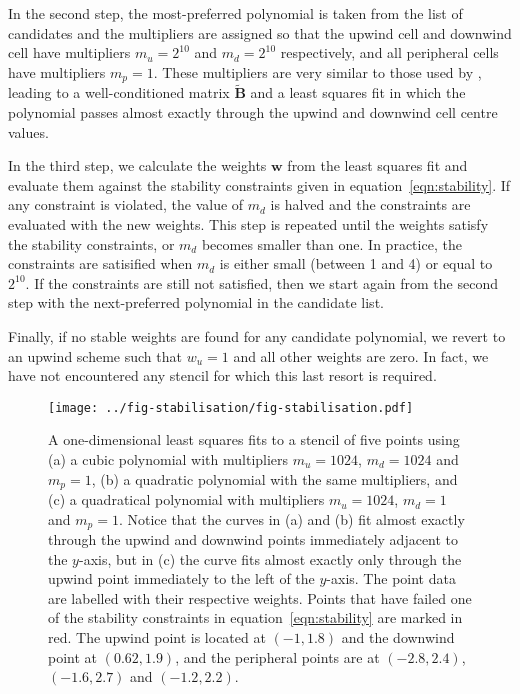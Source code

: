 In the second step, the most-preferred polynomial is taken from the list of candidates and the multipliers are assigned so that the upwind cell and downwind cell have multipliers $m_u = 2^{10}$ and $m_d = 2^{10}$ respectively, and all peripheral cells have multipliers $m_p = 1$.  These multipliers are very similar to those used by \citet{lashley2002}, leading to a well-conditioned matrix $\mathbf{\tilde{B}}$ and a least squares fit in which the polynomial passes almost exactly through the upwind and downwind cell centre values.

In the third step, we calculate the weights $\mathbf{w}$ from the least squares fit and evaluate them against the stability constraints given in equation~\eqref{eqn:stability}.  If any constraint is violated, the value of $m_d$ is halved and the constraints are evaluated with the new weights.  This step is repeated until the weights satisfy the stability constraints, or $m_d$ becomes smaller than one.  In practice, the constraints are satisified when $m_d$ is either small (between 1 and 4) or equal to $2^{10}$.  If the constraints are still not satisfied, then we start again from the second step with the next-preferred polynomial in the candidate list. 

Finally, if no stable weights are found for any candidate polynomial, we revert to an upwind scheme such that $w_u = 1$ and all other weights are zero.  In fact, we have not encountered any stencil for which this last resort is required.

\begin{figure}
	\centering
	\texttt{[image: ../fig-stabilisation/fig-stabilisation.pdf]}
%
	\caption{A one-dimensional least squares fits to a stencil of five points using (a) a cubic polynomial with multipliers $m_u = 1024$, $m_d = 1024$ and $m_p = 1$, (b) a quadratic polynomial with the same multipliers, and (c) a quadratical polynomial with multipliers $m_u = 1024$, $m_d = 1$ and $m_p = 1$.  Notice that the curves in (a) and (b) fit almost exactly through the upwind and downwind points immediately adjacent to the $y$-axis, but in (c) the curve fits almost exactly only through the upwind point immediately to the left of the $y$-axis.  The point data are labelled with their respective weights.  Points that have failed one of the stability constraints in equation~\eqref{eqn:stability} are marked in red.  The upwind point is located at $(-1, 1.8)$ and the downwind point at $(0.62, 1.9)$, and the peripheral points are at $(-2.8, 2.4)$, $(-1.6, 2.7)$ and $(-1.2, 2.2)$.}
	\label{fig:oscillatory1D}
\end{figure}

